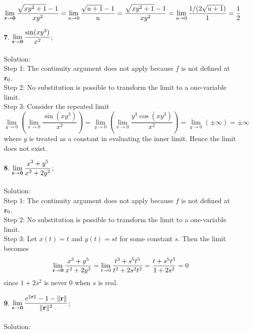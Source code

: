 \documentclass[12pt]{amsbook}
\begin{document}
\begin{enumerate}
$$\lim_{{\bf r} \rightarrow {\bf 0}}\frac{\sqrt{xy^2+1}-1}{xy^2}=\lim_{u \rightarrow 0}\frac{\sqrt{u+1}-1}{u}=\frac{\sqrt{xy^2+1}-1}{xy^2}=\lim_{u \rightarrow 0}\frac{1/(2\sqrt{u+1})}{1}=\frac{1}{2}$$
\item[{\small\bf 7}.] $\! \begin{aligned}[t]
\lim_{{\bf r} \rightarrow {\bf 0}}\frac{\sin(xy^3)}{x^2} \end{aligned}$;
\\
\\
{\sc Solution}:
\\
{\sf Step 1}: The continuity argument does not apply because $f$ is not defined at ${\bf r}_0$.
\\
{\sf Step 2}: No substitution is possible to transform the limit to a one-variable
limit.
\\
{\sf Step 3}: Consider the repeated limit
$$\lim_{y \rightarrow 0}(\lim_{x \rightarrow 0}\frac{\sin(xy^3)}{x^2})=\lim_{y \rightarrow 0}(\lim_{x \rightarrow 0}\frac{y^3\cos(xy^3)}{x^2})=\lim_{y \rightarrow 0}(\pm \infty)=\pm \infty$$
where $y$ is treated as a constant in evaluating the inner limit. Hence the limit does not exist.
\\
\item[{\small\bf 8}.] $\! \begin{aligned}[t]
\lim_{{\bf r} \rightarrow {\bf 0}}\frac{x^3+y^5}{x^2+2y^2} \end{aligned}$;
\\
\\
{\sc Solution}:
\\
{\sf Step 1}: The continuity argument does not apply because $f$ is not defined at ${\bf r}_0$.
\\
{\sf Step 2}: No substitution is possible to transform the limit to a one-variable
limit.
\\
{\sf Step 3}: Let $x(t)=t$ and $y(t)=st$ for some constant $s$. Then the limit becomes
$$\lim_{{\bf r} \rightarrow {\bf 0}}\frac{x^3+y^5}{x^2+2y^2}=\lim_{t \rightarrow 0}\frac{t^3+s^5t^5}{t^2+2s^2t^2}=\frac{t+s^5t^3}{1+2s^2}=0$$
since $1+2s^2$ is never $0$ when $s$ is real.
\\
\item[{\small\bf 9}.] $\! \begin{aligned}[t]
\lim_{{\bf r} \rightarrow {\bf 0}}\frac{e^{\|{\bf r}\|}-1-\|{\bf r}\|}{\|{\bf r}\|^2} \end{aligned}$;
\\
\\
{\sc Solution}:
\\

\end{enumerate}
\end{document}
